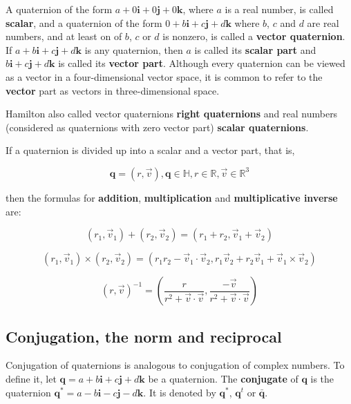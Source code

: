 A quaternion of the form $ a + 0 \mathbf{i} + 0 \mathbf{j} + 0 \mathbf{k} $,
where $ a $ is a real number, is called \textbf{scalar}, and a quaternion of the form
$ 0 + b \mathbf{i} + c \mathbf{j} + d \mathbf{k} $ where $ b $, $ c $ and $ d $
are real numbers, and at least on of $ b $, $ c $ or $ d $ is nonzero, is called
a \textbf{vector quaternion}. If $ a + b \mathbf{i} + c \mathbf{j} + d \mathbf{k} $
is any quaternion, then $ a $ is called its \textbf{scalar part} and
$ b \mathbf{i} + c \mathbf{j} + d \mathbf{k} $ is called its \textbf{vector part}.
Although every quaternion can be viewed as a vector in a four-dimensional
vector space, it is common to refer to the \textbf{vector} part as vectors in
three-dimensional space.

Hamilton also called vector quaternions \textbf{right quaternions} and real
numbers (considered as quaternions with zero vector part) \textbf{scalar quaternions}.

If a quaternion is divided up into a scalar and a vector part, that is,

\begin{equation}
    \mathbf{q} = (r, \vec{v}), \mathbf{q} \in \mathbb{H}, r \in \mathbb{R}, \vec{v} \in \mathbb{R}^3
\end{equation}

then the formulas for \textbf{addition}, \textbf{multiplication}
and \textbf{multiplicative inverse} are:

\begin{equation}
    (r_1, \vec{v}_1) + (r_2, \vec{v}_2) = (r_1 + r_2, \vec{v}_1 + \vec{v}_2 )
\end{equation}

\begin{equation}
    (r_1, \vec{v}_1) \times (r_2, \vec{v}_2) = (r_1 r_2 - \vec{v}_1 \cdot \vec{v}_2, r_1 \vec{v}_2 + r_2 \vec{v}_1 + \vec{v}_1 \times \vec{v}_2)
\end{equation}

\begin{equation}
    (r, \vec{v})^{-1} =
    \left(
        \frac{r} {r^2 + \vec{v} \cdot \vec{v}},
        \frac{-\vec{v}} {r^2 + \vec{v} \cdot \vec{v}}
    \right)
\end{equation}


\subsection{Conjugation, the norm and reciprocal}

Conjugation of quaternions is analogous to conjugation of complex numbers.
To define it, let $ \mathbf{q} = a + b \mathbf{i} + c \mathbf{j} + d \mathbf{k} $
be a quaternion. The \textbf{conjugate} of $ \mathbf{q} $ is the quaternion
$ \mathbf{q}^{*} = a - b \mathbf{i} - c \mathbf{j} - d \mathbf{k} $.
It is denoted by $ \mathbf{q}^{*} $, $ \mathbf{q}^{t} $ or $ \bar{\mathbf{q}} $.

